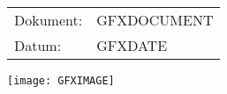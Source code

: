 ﻿\documentclass{scrartcl}
\begin{document}
\begin{tabular}{ @{} p{} p{} @{} }
Dokument:   & GFXDOCUMENT \\
Datum:      & GFXDATE \\
\end{tabular}

\vspace{0.5cm}
\texttt{[image: GFXIMAGE]}
\end{document}
